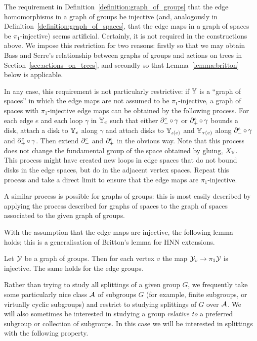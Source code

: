 \begin{remark}
  The requirement in Definition~\ref{definition:graph_of_groups} that the edge homomorphisms in a graph of groups be injective (and, analogously in Definition~\ref{definition:graph_of_spaces}, that the edge maps in a graph of spaces be $\pi_1$-injective) seems artificial.
  Certainly, it is not required in the constructions above.
  We impose this restriction for two reasons: firstly so that we may obtain Bass and Serre's relationship between graphs of groups and actions on trees in Section~\ref{sec:actions_on_trees}, and secondly so that Lemma~\ref{lemma:britton} below is applicable.

  In any case, this requirement is not particularly restrictive: if $\mathbb{Y}$ is a ``graph of spaces'' in which the edge maps are not assumed to be $\pi_1$-injective, a graph of spaces with $\pi_1$-injective edge maps can be obtained by the following process.
  For each edge $e$ and each loop $\gamma$ in $\mathbb{Y}_e$ such that either $\partial^e_{-} \operatorname{\circ} \gamma$ or $\partial^e_{+} \operatorname{\circ} \gamma$ bounds a disk, attach a disk to $\mathbb{Y}_e$ along $\gamma$ and attach disks to $\mathbb{Y}_{\operatorname{\iota}(e)}$ and $\mathbb{Y}_{\operatorname{\tau}(e)}$ along $\partial^e_{-} \operatorname{\circ} \gamma$ and $\partial^e_{+} \operatorname{\circ} \gamma$.
  Then extend $\partial^e_{-}$ and $\partial^e_{+}$ in the obvious way.
  Note that this process does not change the fundamental group of the space obtained by gluing, $X_{\mathbb{Y}}$.
  This process might have created new loops in edge spaces that do not bound disks in the edge spaces, but do in the adjacent vertex spaces.
  Repeat this process and take a direct limit to ensure that the edge maps are $\pi_1$-injective.

  A similar process is possible for graphs of groups: this is most easily described by applying the process described for graphs of spaces to the graph of spaces associated to the given graph of groups.
\end{remark}

With the assumption that the edge maps are injective, the following lemma holds; this is a generalisation of Britton's lemma for HNN extensions.

\begin{lemma}\cite[Corollary 1]{serre77}
  \label{lemma:britton}
  Let $\mathcal{Y}$ be a graph of groups.
  Then for each vertex $v$ the map $\mathcal{Y}_v \to \pi_1\mathcal{Y}$ is injective.
  The same holds for the edge groups.
\end{lemma}

Rather than trying to study all splittings of a given group $G$, we frequently take some particularly nice class $\mathcal{A}$ of subgroups $G$ (for example, finite subgroups, or virtually cyclic subgroups) and restrict to studying splittings of $G$ over $\mathcal{A}$.
We will also sometimes be interested in studying a group \emph{relative to} a preferred subgroup or collection of subgroups.
In this case we will be interested in splittings with the following property.

